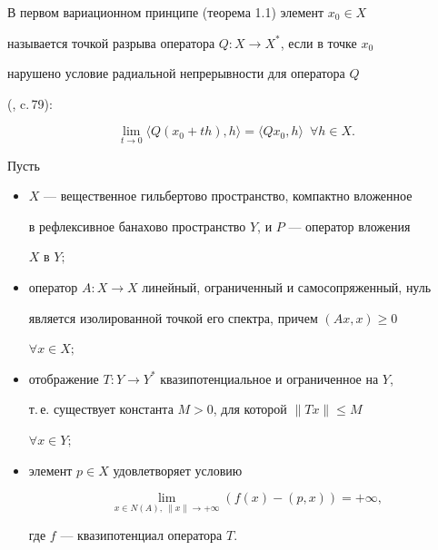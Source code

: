 В первом вариационном принципе (теорема 1.1) элемент $x_{0} \in X$


называется точкой разрыва оператора $Q:X \to X^{*}$, если в точке $x_0$


нарушено условие радиальной непрерывности для оператора $Q$


(\cite{n16}, c.\,79):


\begin{equation}


\lim\limits_{t \to 0} \langle Q(x_0+th),h \rangle =


\langle Qx_0,h \rangle \ \; \forall h \in X. \label{eq1.2}


\end{equation}





\begin{thms}


Пусть


\begin{itemize}


\item[1)] $X$ --- вещественное гильбертово пространство, компактно вложенное


в рефлексивное банахово пространство $Y$, и $P$ --- оператор вложения


$X$ в $Y;$


\item[2)] оператор $A:X \to X$ линейный, ограниченный и самосопряженный, нуль


является изолированной точкой его спектра, причем $(Ax,x) \ge 0$


$\forall x \in X;$


\item[3)] отображение $T:Y \to Y^{*}$ квазипотенциальное и ограниченное на $Y$,


т.\,е. существует константа $M>0$, для которой $\|Tx\| \le M$


$\forall x \in Y;$


\item[4)] элемент $p \in X$ удовлетворяет условию


\begin{equation}


\lim\limits_{x \in N(A),\ \|x\| \to +\infty}(f(x)-(p,x))=+\infty,


\label{eq1.3}


\end{equation}


где $f$ --- квазипотенциал оператора $T$.



\end{itemize}
\end{thms}
